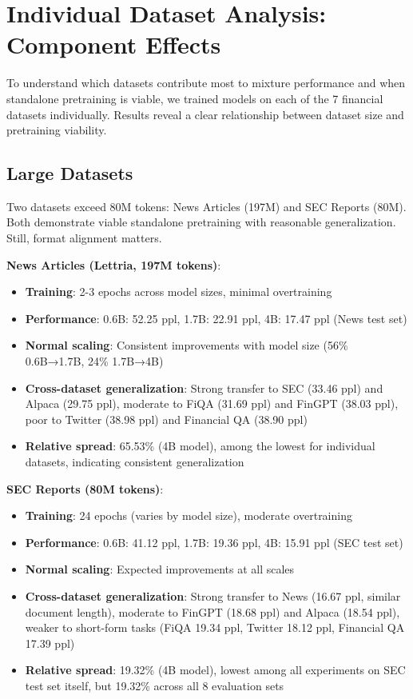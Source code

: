 \section{Individual Dataset Analysis: Component Effects}

To understand which datasets contribute most to mixture performance and when standalone pretraining is viable, we trained models on each of the 7 financial datasets individually. Results reveal a clear relationship between dataset size and pretraining viability.

\subsection{Large Datasets}

Two datasets exceed 80M tokens: News Articles (197M) and SEC Reports (80M). Both demonstrate viable standalone pretraining with reasonable generalization. Still, format alignment matters.

\textbf{News Articles (Lettria, 197M tokens)}:
\begin{itemize}
\item \textbf{Training}: 2-3 epochs across model sizes, minimal overtraining
\item \textbf{Performance}: 0.6B: 52.25 ppl, 1.7B: 22.91 ppl, 4B: 17.47 ppl (News test set)
\item \textbf{Normal scaling}: Consistent improvements with model size (56\% 0.6B→1.7B, 24\% 1.7B→4B)
\item \textbf{Cross-dataset generalization}: Strong transfer to SEC (33.46 ppl) and Alpaca (29.75 ppl), moderate to FiQA (31.69 ppl) and FinGPT (38.03 ppl), poor to Twitter (38.98 ppl) and Financial QA (38.90 ppl)
\item \textbf{Relative spread}: 65.53\% (4B model), among the lowest for individual datasets, indicating consistent generalization
\end{itemize}

\textbf{SEC Reports (80M tokens)}:
\begin{itemize}
\item \textbf{Training}: 24 epochs (varies by model size), moderate overtraining
\item \textbf{Performance}: 0.6B: 41.12 ppl, 1.7B: 19.36 ppl, 4B: 15.91 ppl (SEC test set)
\item \textbf{Normal scaling}: Expected improvements at all scales
\item \textbf{Cross-dataset generalization}: Strong transfer to News (16.67 ppl, similar document length), moderate to FinGPT (18.68 ppl) and Alpaca (18.54 ppl), weaker to short-form tasks (FiQA 19.34 ppl, Twitter 18.12 ppl, Financial QA 17.39 ppl)
\item \textbf{Relative spread}: 19.32\% (4B model), lowest among all experiments on SEC test set itself, but 19.32\% across all 8 evaluation sets
\end{itemize}

